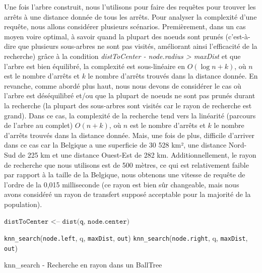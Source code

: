 \documentclass[12pt]{article}
\begin{document}
Une fois l'arbre construit, nous l'utilisons pour faire des requêtes pour trouver les arrêts à une distance donnée de tous les arrêts. Pour analyser la complexité d'une requête, nous allons considérer
plusieurs scénarios. Premièrement, dans un cas moyen voire optimal, à savoir quand la plupart des noeuds sont prunés (c'est-à-dire que plusieurs sous-arbres ne sont pas visités, améliorant ainsi l'efficacité
de la recherche) grâce à la condition \emph{distToCenter - node.radius > maxDist} et que l'arbre est bien équilibré, la complexité est sous-linéaire en $O(\log n + k)$, où $n$ est le nombre d'arrêts 
et $k$ le nombre d'arrêts trouvés dans la distance donnée. En revanche, comme abordé plus haut, nous nous devons de considérer le cas où l'arbre est déséquilibré et/ou que la plupart de noeuds ne sont 
pas prunés durant la recherche (la plupart des sous-arbres sont visités car le rayon de recherche est grand). Dans ce cas, la complexité de la recherche tend vers la linéarité (parcours de l'arbre au complet)
$O(n + k)$, où $n$ est le nombre d'arrêts et $k$ le nombre d'arrêts trouvés dans la distance donnée. Mais, une fois de plus, difficile d'arriver dans ce cas car la Belgique a une superficie de 30 528 km², une
distance Nord-Sud de 225 km et une distance Ouest-Est de 282 km. Additionnellement, le rayon de recherche que nous utilisons est de 500 mètres, ce qui est relativement faible par rapport à la taille de la Belgique,
nous obtenons une vitesse de requête de l'ordre de la 0,015 milliseconde (ce rayon est bien sûr changeable, mais nous avons considéré un rayon de transfert supposé acceptable pour la majorité de la population).

\begin{algorithm}[H]
    \footnotesize
    \DontPrintSemicolon
    
    
    $\texttt{distToCenter <-- dist(q, node.center)}$\;
    
    \texttt{knn_search}(\texttt{node.left}, q, \texttt{maxDist}, \texttt{out})\;
    \texttt{knn_search}(\texttt{node.right}, q, \texttt{maxDist}, \texttt{out})\;
\caption{knn_search - Recherche en rayon dans un BallTree}
\end{algorithm}
\end{document}
